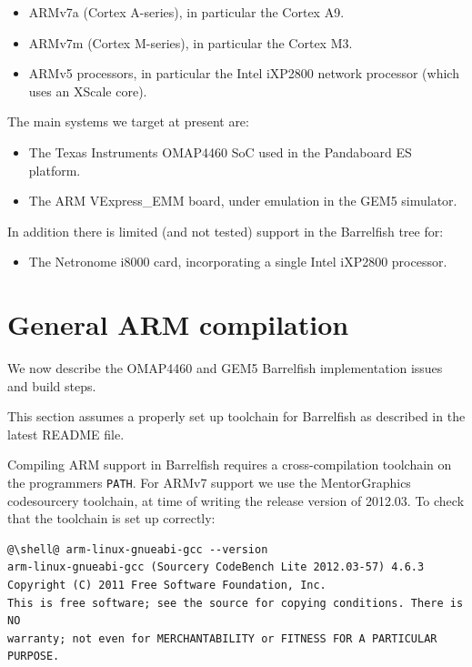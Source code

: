 \documentclass[a4paper,twoside]{report} %
\begin{document}
\begin{itemize}
\item ARMv7a (Cortex A-series), in particular the Cortex A9. 
\item ARMv7m (Cortex M-series), in particular the Cortex M3. 
\item ARMv5 processors, in particular the Intel iXP2800 network
  processor (which uses an XScale core). 
\end{itemize}

The main systems we target at present are:
\begin{itemize}
\item The Texas Instruments OMAP4460 SoC used in the Pandaboard ES
  platform. 
\item The ARM VExpress\_EMM board, under emulation in the GEM5
  simulator. 
\end{itemize}

In addition there is limited (and not tested) support in the
Barrelfish tree for:
\begin{itemize}
\item The Netronome i8000 card, incorporating a single Intel iXP2800
  processor. 
\end{itemize}


\chapter{General ARM compilation}
\label{sec:armcompile}

We now describe the OMAP4460 and GEM5 Barrelfish implementation issues
and build steps. 

This section assumes a properly set up toolchain for Barrelfish as
described in the latest README file.

Compiling ARM support in Barrelfish requires a cross-compilation
toolchain on the programmers \texttt{PATH}.  For ARMv7 support we use
the MentorGraphics codesourcery toolchain, at time of writing the
release version of 2012.03.  To check that the toolchain is set up
correctly: 
\begin{lstlisting}
@\shell@ arm-linux-gnueabi-gcc --version
arm-linux-gnueabi-gcc (Sourcery CodeBench Lite 2012.03-57) 4.6.3
Copyright (C) 2011 Free Software Foundation, Inc.
This is free software; see the source for copying conditions. There is NO
warranty; not even for MERCHANTABILITY or FITNESS FOR A PARTICULAR PURPOSE.
\end{lstlisting}
\end{document}
